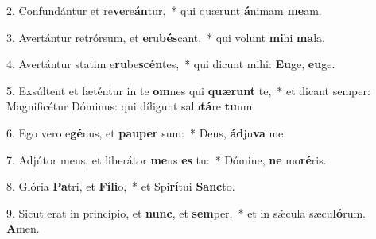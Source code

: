 2. Confundántur et re\textbf{ve}re\textbf{án}tur,~*  qui quærunt \textbf{á}nimam \textbf{me}am.\

3. Avertántur retrórsum, et \textbf{e}ru\textbf{bés}cant,~*  qui volunt \textbf{mi}hi \textbf{ma}la.\

4. Avertántur statim e\textbf{ru}be\textbf{scén}tes,~*  qui dicunt mihi: \textbf{Eu}ge, \textbf{eu}ge.\

5. Exsúltent et læténtur in te \textbf{om}nes qui \textbf{quæ}\textbf{runt} te,~*  et dicant semper: Magnificétur Dóminus: qui díligunt salu\textbf{tá}re \textbf{tu}um.\

6. Ego vero e\textbf{gé}nus, et \textbf{pau}\textbf{per} sum:~*  Deus, \textbf{ád}ju\textbf{va} me.\

7. Adjútor meus, et liberátor \textbf{me}us \textbf{es} tu:~*  Dómine, \textbf{ne} mo\textbf{ré}ris.\

8. Glória \textbf{Pa}tri, et \textbf{Fí}\textbf{li}o,~*  et Spi\textbf{rí}tui \textbf{Sanc}to.\

9. Sicut erat in princípio, et \textbf{nunc}, et \textbf{sem}per,~*  et in sǽcula sæcu\textbf{ló}rum. \textbf{A}men.\

